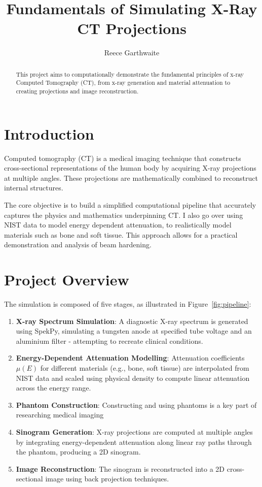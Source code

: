\documentclass{article}
\title{Fundamentals of Simulating X-Ray CT Projections}
\author{Reece Garthwaite}
\date{}
\theoremstyle{definition}
\begin{document}
\maketitle

\begin{abstract}
This project aims to computationally demonstrate the fundamental principles of x-ray Computed Tomography (CT), from x-ray generation and material attenuation to creating projections and image reconstruction.
\end{abstract}

\section{Introduction}
Computed tomography (CT) is a medical imaging technique that constructs cross-sectional representations of the human body by acquiring X-ray projections at multiple angles. These projections are mathematically combined to reconstruct internal structures.

The core objective is to build a simplified computational pipeline that accurately captures the physics and mathematics underpinning CT. I also go over using NIST data to model energy dependent attenuation, to realistically model materials such as bone and soft tissue. This approach allows for a practical demonstration and analysis of beam hardening.

\section{Project Overview}
The simulation is composed of five stages, as illustrated in Figure~\ref{fig:pipeline}:

\begin{enumerate}
    \item \textbf{X-ray Spectrum Simulation}: A diagnostic X-ray spectrum is generated using SpekPy, simulating a tungsten anode at specified tube voltage and an aluminium filter - attempting to recreate clinical conditions.

    \item \textbf{Energy-Dependent Attenuation Modelling}: Attenuation coefficients $\mu(E)$ for different materials (e.g., bone, soft tissue) are interpolated from NIST data and scaled using physical density to compute linear attenuation across the energy range.

    \item \textbf{Phantom Construction}: Constructing and using phantoms is a key part of researching medical imaging

    \item \textbf{Sinogram Generation}: X-ray projections are computed at multiple angles by integrating energy-dependent attenuation along linear ray paths through the phantom, producing a 2D sinogram.

    \item \textbf{Image Reconstruction}: The sinogram is reconstructed into a 2D cross-sectional image using back projection techniques.
\end{enumerate}
\end{document}
